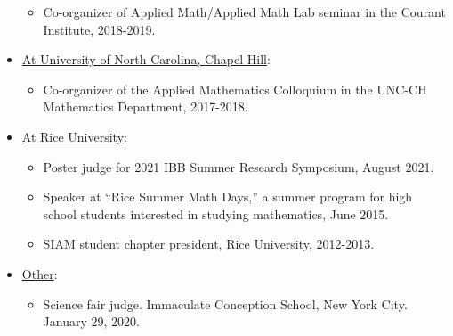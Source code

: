 \documentclass{article} %
\begin{document}
\begin{itemize}
\begin{itemize}
\item Co-organizer of Applied Math/Applied Math Lab seminar in the Courant Institute, 2018-2019.
\end{itemize}
\item \underline{At University of North Carolina, Chapel Hill}:
\begin{itemize}
\item Co-organizer of the Applied Mathematics Colloquium in the UNC-CH Mathematics Department, 2017-2018.
\end{itemize}
\item \underline{At Rice University}:
\begin{itemize}
\item Poster judge for 2021 IBB Summer Research Symposium, August 2021.
\item Speaker at ``Rice Summer Math Days,'' a summer program for high school students interested in studying mathematics, June 2015.
\item SIAM student chapter president, Rice University, 2012-2013.
\end{itemize}
\item \underline{Other}:
\begin{itemize}
\item Science fair judge.  Immaculate Conception School, New York City. January 29, 2020.
\end{itemize}
\end{itemize}
\end{document}
